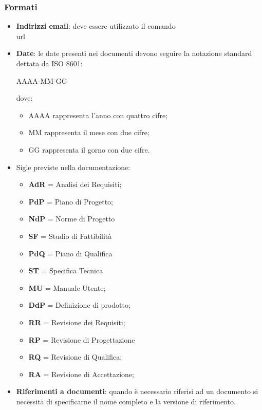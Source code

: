 \subsubsection{Formati}
\begin{itemize}
\item \textbf{Indirizzi email}: deve essere utilizzato il comando  \\url
\item \textbf{Date}: le date presenti nei documenti devono seguire la notazione standard dettata da ISO 8601:

  \begin{center}
    AAAA-MM-GG
  \end{center}
  
  dove:
  \begin{itemize}
  \item AAAA rappresenta l'anno con quattro cifre;
  \item MM rappresenta il mese con due cifre;
  \item GG rappresenta il gorno con due cifre.
  \end{itemize}
\item Sigle previste nella documentazione:
  \begin{itemize}
  \item \textbf{AdR} = Analisi dei Requisiti;
  \item \textbf{PdP} = Piano di Progetto;
  \item \textbf{NdP} = Norme di Progetto
  \item \textbf{SF} = Studio di Fattibilità
  \item \textbf{PdQ} = Piano di Qualifica
  \item \textbf{ST} = Specifica Tecnica
  \item \textbf{MU} = Manuale Utente;
  \item \textbf{DdP} = Definizione di prodotto;
  \item \textbf{RR} = Revisione dei Requisiti;
  \item \textbf{RP} = Revisione di Progettazione
  \item \textbf{RQ} = Revisione di Qualifica;
  \item \textbf{RA} = Revisione di Accettazione;
  \end{itemize}
\item \textbf{Riferimenti a documenti}: quando \`e necessario riferisi ad un documento si necessita di specificarne il nome completo e la versione di riferimento.
\end{itemize}

